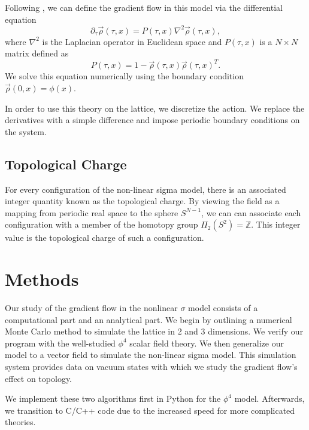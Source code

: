 \documentclass[12pt]{report}
\begin{document}
Following \cite{bietenholz2018}, we can define the gradient flow in this model via the differential equation
\begin{equation}
    \label{eq:nsm_gradflow}
    \partial_\tau \vec\rho (\tau,x) = P(\tau,x) \nabla^2 \vec\rho(\tau,x),
\end{equation}
where $\nabla^2$ is the Laplacian operator in Euclidean space and $P(\tau,x)$ is a $N \times N$ matrix defined as
\begin{equation*}
    P(\tau, x) = 1 - \vec\rho(\tau,x) \vec\rho(\tau,x)^T.
\end{equation*}
We solve this equation numerically using the boundary condition $\vec\rho(0,x) = \phi(x)$.

In order to use this theory on the lattice, we discretize the action. We replace the derivatives with a simple difference and impose periodic boundary conditions on the system.

\section{Topological Charge}

For every configuration of the non-linear sigma model, there is an associated integer quantity known as the topological charge. By viewing the field as a mapping from periodic real space to the sphere $S^{N-1}$, we can can associate each configuration with a member of the homotopy group $\Pi_2(S^2) = \mathbb{Z}$. This integer value is the topological charge of such a configuration. 




\chapter{Methods}
\label{sec:methods}
Our study of the gradient flow in the nonlinear $\sigma$ model consists of a computational part and an analytical part. We begin by outlining a numerical Monte Carlo method to simulate the lattice in 2 and 3 dimensions. We verify our program with the well-studied $\phi^4$ scalar field theory. We then generalize our model to a vector field to simulate the non-linear sigma model. This simulation system provides data on vacuum states with which we study the gradient flow's effect on topology.

We implement these two algorithms first in Python for the $\phi^4$ model. Afterwards, we transition to C/C++ code due to the increased speed for more complicated theories. 
\end{document}
